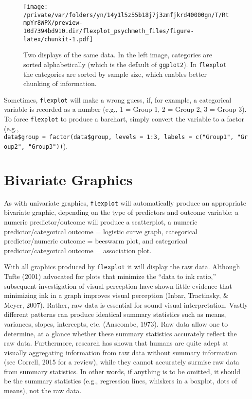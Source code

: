 \documentclass[
  english,
  man]{apa6}
\begin{document}
\small

\begin{figure}
\centering
\texttt{[image: /private/var/folders/yn/14y1l5z55b18j7j3zmfjkrd40000gn/T/RtmpYr8WPX/preview-10d7394bd910.dir/flexplot\_psychmeth\_files/figure-latex/chunkit-1.pdf]}
\caption{\label{fig:chunkit}Two displays of the same data. In the left image, categories are sorted alphabetically (which is the default of \texttt{ggplot2}). In \texttt{flexplot} the categories are sorted by sample size, which enables better chunking of information. \label{fig:chunkit}}
\end{figure}

\normalsize

Sometimes, \texttt{flexplot} will make a wrong guess, if, for example, a categorical variable is recorded as a number (e.g., 1 = Group 1, 2 = Group 2, 3 = Group 3). To force \texttt{flexplot} to produce a barchart, simply convert the variable to a factor (e.g., \texttt{data\$group\ =\ factor(data\$group,\ levels\ =\ 1:3,\ labels\ =\ c("Group1",\ "Group2",\ "Group3"))}).

\hypertarget{bivariate-graphics}{%
\section{Bivariate Graphics}\label{bivariate-graphics}}

As with univariate graphics, \texttt{flexplot} will automatically produce an appropriate bivariate graphic, depending on the type of predictors and outcome variable: a numeric predictor/outcome will produce a scatterplot, a numeric predictor/categorical outcome = logistic curve graph, categorical predictor/numeric outcome = beeswarm plot, and categorical predictor/categorical outcome = association plot.

With all graphics produced by \texttt{flexplot} it will display the raw data. Although Tufte (2001) advocated for plots that minimize the ``data to ink ratio,'' subsequent investigation of visual perception have shown little evidence that minimizing ink in a graph improves visual perception (Inbar, Tractinsky, \& Meyer, 2007). Rather, raw data is essential for sound visual interpretation. Vastly different patterns can produce identical summary statistics such as means, variances, slopes, intercepts, etc. (Anscombe, 1973). Raw data allow one to determine, at a glance whether these summary statistics accurately reflect the raw data. Furthermore, research has shown that humans are quite adept at visually aggregating information from raw data without summary information (see Correll, 2015 for a review), while they cannot accurately surmise raw data from summary statistics. In other words, if anything is to be omitted, it should be the summary statistics (e.g., regression lines, whiskers in a boxplot, dots of means), not the raw data.
\end{document}
